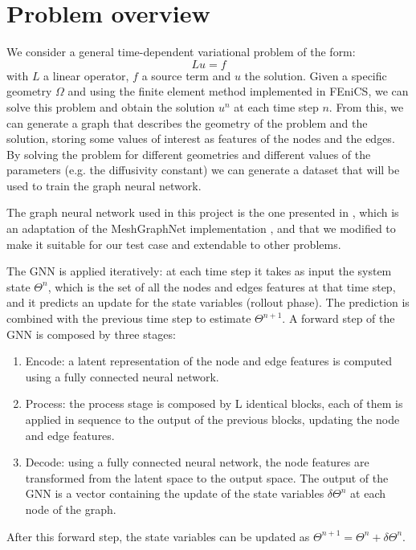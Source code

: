 \documentclass[11pt,a4paper]{article}
\begin{document}
\section{Problem overview}

We consider a general time-dependent variational problem of the form:
\[Lu=f\]
with \(L\) a linear operator, \(f\) a source term and \(u\) the solution. Given a specific geometry \(\Omega\) and using the finite element method implemented in FEniCS, we can solve this problem and obtain the solution \(u^{n}\) at each time step \(n\). From this, we can generate a graph that describes the geometry of the problem and the solution, storing some values of interest as features of the nodes and the edges. By solving the problem for different geometries and different values of the parameters (e.g. the diffusivity constant) we can generate a dataset that will be used to train the graph neural network. 

The graph neural network used in this project is the one presented in \cite{Luca}, which is an adaptation of the MeshGraphNet implementation \cite{MeshGraphNet}, and that we modified to make it suitable for our test case and extendable to other problems.

The GNN is applied iteratively: at each time step it takes as input the system state \(\Theta^{n}\), which is the set of all the nodes and edges features at that time step, and it predicts an update for the state variables (rollout phase). The prediction is combined with the previous time step to estimate \(\Theta^{n+1}\). 
A forward step of the GNN is composed by three stages:
\begin{enumerate}
    \item Encode: a latent representation of the node and edge features is computed using a fully connected neural network.
    \item Process: the process stage is composed by L identical blocks, each of them is applied in sequence to the output of the previous blocks, updating the node and edge features. 
    \item Decode: using a fully connected neural network, the node features are transformed from the latent space to the output space. The output of the GNN is a vector containing the update of the state variables \(\delta\Theta^n\) at each node of the graph. 
\end{enumerate}
After this forward step, the state variables can be updated as \(\Theta^{n+1} = \Theta^{n} + \delta\Theta^{n}\).
\end{document}
